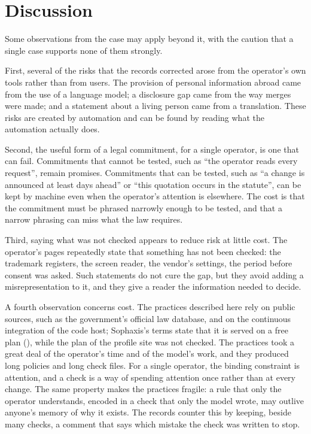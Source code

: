 \documentclass[11pt]{article}
\newcommand{\ev}[1]{\directlua{ev("\luaescapestring{#1}")}}
\newcommand{\citeev}[1]{(\ev{#1})}
\begin{document}
\section{Discussion}\label{sec:discussion}

Some observations from the case may apply beyond it, with the caution that a single case supports none of them strongly.

First, several of the risks that the records corrected arose from the operator's own tools rather than from users. The provision of personal information abroad came from the use of a language model; a disclosure gap came from the way merges were made; and a statement about a living person came from a translation. These risks are created by automation and can be found by reading what the automation actually does.

Second, the useful form of a legal commitment, for a single operator, is one that can fail. Commitments that cannot be tested, such as ``the operator reads every request'', remain promises. Commitments that can be tested, such as ``a change is announced at least \nNoticeDays{} days ahead'' or ``this quotation occurs in the statute'', can be kept by machine even when the operator's attention is elsewhere. The cost is that the commitment must be phrased narrowly enough to be tested, and that a narrow phrasing can miss what the law requires.

Third, saying what was not checked appears to reduce risk at little cost. The operator's pages repeatedly state that something has not been checked: the trademark registers, the screen reader, the vendor's settings, the period before consent was asked. Such statements do not cure the gap, but they avoid adding a misrepresentation to it, and they give a reader the information needed to decide.

A fourth observation concerns cost. The practices described here rely on public sources, such as the government's official law database, and on the continuous integration of the code host; Sophaxis's terms state that it is served on a free plan \citeev{sx-free}, while the plan of the profile site was not checked. The practices took a great deal of the operator's time and of the model's work, and they produced long policies and long check files. For a single operator, the binding constraint is attention, and a check is a way of spending attention once rather than at every change. The same property makes the practices fragile: a rule that only the operator understands, encoded in a check that only the model wrote, may outlive anyone's memory of why it exists. The records counter this by keeping, beside many checks, a comment that says which mistake the check was written to stop.
\end{document}
